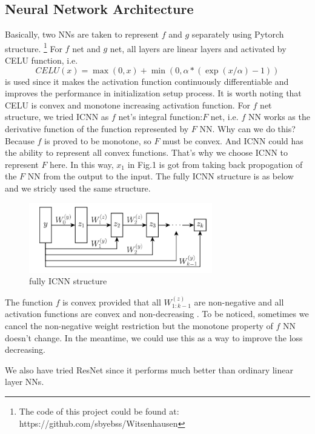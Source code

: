 \documentclass[conference,compsoc]{IEEEtran}
\begin{document}
\subsection{Neural Network Architecture}
 Basically, two NNs are taken to represent $f$ and $g$ separately using Pytorch structure. \footnote{The code of this project could be found at: https://github.com/sbyebss/Witsenhausen}
For $f$ net and $g$ net, all layers are linear layers and activated by CELU\cite{barron2017continuously} function, i.e. 
\begin{equation}
  CELU(x)=\max(0,x)+\min(0,\alpha*(\exp(x/\alpha)-1))
\end{equation}
is used since it makes the activation function continuously differentiable and improves the performance in initialization setup process. It is worth noting that CELU is convex and monotone increasing activation function.
For $f$ net structure, we tried ICNN as $f$ net's integral function:$F$ net, i.e. $f$ NN works as the derivative function of the function represented by $F$ NN. Why can we do this? Because $f$ is proved to be monotone, so $F$ must be convex. And ICNN could has the ability to represent all convex functions. That's why we choose ICNN to represent $F$ here. In this way, $x_1$ in Fig.1 is got from taking back propogation of the $F$ NN from the output to the input. The fully ICNN structure is as below and we stricly used the same structure.
\begin{figure}[htp]
  \centering
  \includegraphics[width=8cm]{images/ICNN.png}
  \caption{fully ICNN structure}
  \label{fig:definition}
\end{figure}

The function $f$ is convex provided that all $W_{1:k-1}^{(z)}$ are non-negative and all activation functions are convex and non-decreasing \cite{amos2017input}. To be noticed, sometimes we cancel the non-negative weight restriction but the monotone property of $f$ NN doesn't change. In the meantime, we could use this as a way to improve the loss decreasing.

We also have tried ResNet\cite{he2016deep} since it performs much better than ordinary linear layer NNs. 
\end{document}
